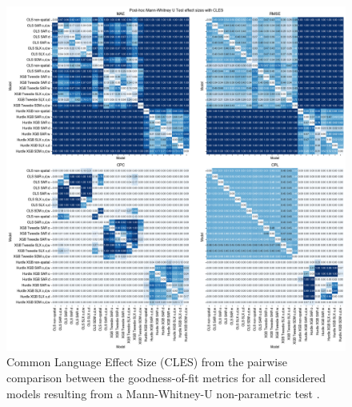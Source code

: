 \begin{figure}[ht!]
    \centering
    \includegraphics[width=1\textwidth]{fig_MWU_results_Bonf_effect_size_CLES_n1000_r.png}
    \caption{Common Language Effect Size (CLES) \citep{Vargha2000AWong} from the pairwise comparison between the goodness-of-fit metrics for all considered models resulting from a Mann-Whitney-U non-parametric test \citep{Mann1947}.}
    \label{fig:MWU_test_2x2_effectSize}
\end{figure}

% 
% 
% 